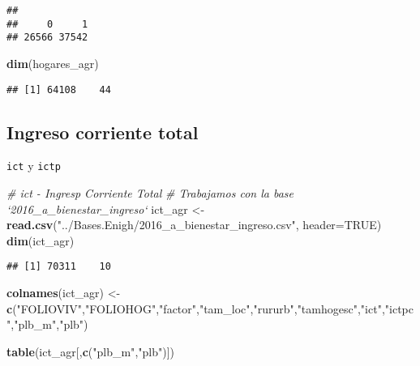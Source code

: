 \documentclass[11pt,]{article}
\newenvironment{Shaded}{\begin{snugshade}}{\end{snugshade}}
\newcommand{\KeywordTok}[1]{\textcolor[rgb]{0.13,0.29,0.53}{\textbf{#1}}}
\newcommand{\DataTypeTok}[1]{\textcolor[rgb]{0.13,0.29,0.53}{#1}}
\newcommand{\StringTok}[1]{\textcolor[rgb]{0.31,0.60,0.02}{#1}}
\newcommand{\CommentTok}[1]{\textcolor[rgb]{0.56,0.35,0.01}{\textit{#1}}}
\newcommand{\OtherTok}[1]{\textcolor[rgb]{0.56,0.35,0.01}{#1}}
\newcommand{\NormalTok}[1]{#1}
\begin{document}
\begin{verbatim}
## 
##     0     1 
## 26566 37542
\end{verbatim}

\begin{Shaded}
\begin{Highlighting}[]
\KeywordTok{dim}\NormalTok{(hogares_agr)}
\end{Highlighting}
\end{Shaded}

\begin{verbatim}
## [1] 64108    44
\end{verbatim}

\subsection{Ingreso corriente total}\label{ingreso-corriente-total}

\texttt{ict} y \texttt{ictp}

\begin{Shaded}
\begin{Highlighting}[]
\CommentTok{# ict - Ingresp Corriente Total}
\CommentTok{# Trabajamos con la base `2016_a_bienestar_ingreso`}
\NormalTok{ict_agr <-}\StringTok{ }\KeywordTok{read.csv}\NormalTok{(}\StringTok{"../Bases.Enigh/2016_a_bienestar_ingreso.csv"}\NormalTok{, }\DataTypeTok{header=}\OtherTok{TRUE}\NormalTok{)}
\KeywordTok{dim}\NormalTok{(ict_agr)}
\end{Highlighting}
\end{Shaded}

\begin{verbatim}
## [1] 70311    10
\end{verbatim}

\begin{Shaded}
\begin{Highlighting}[]
\KeywordTok{colnames}\NormalTok{(ict_agr) <-}\StringTok{ }\KeywordTok{c}\NormalTok{(}\StringTok{"FOLIOVIV"}\NormalTok{,}\StringTok{"FOLIOHOG"}\NormalTok{,}\StringTok{"factor"}\NormalTok{,}\StringTok{"tam_loc"}\NormalTok{,}\StringTok{"rururb"}\NormalTok{,}\StringTok{"tamhogesc"}\NormalTok{,}\StringTok{"ict"}\NormalTok{,}\StringTok{"ictpc"}\NormalTok{,}\StringTok{"plb_m"}\NormalTok{,}\StringTok{"plb"}\NormalTok{)}

\KeywordTok{table}\NormalTok{(ict_agr[,}\KeywordTok{c}\NormalTok{(}\StringTok{"plb_m"}\NormalTok{,}\StringTok{"plb"}\NormalTok{)])}
\end{Highlighting}
\end{Shaded}
\end{document}
